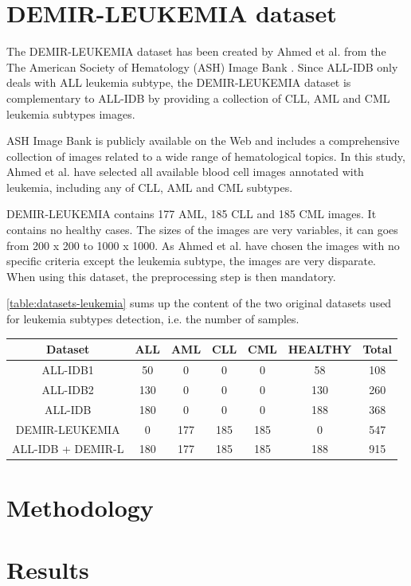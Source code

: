 \documentclass[11pt, openany]{report}
\theoremstyle{plain}
\theoremstyle{definition}
\theoremstyle{remark}
\begin{document}
\newpage
\section{DEMIR-LEUKEMIA dataset}
The DEMIR-LEUKEMIA dataset has been created by Ahmed et al. \cite{leukemia} from the The American Society of Hematology (ASH) Image Bank \cite{ASH}. Since ALL-IDB only deals with ALL leukemia subtype, the DEMIR-LEUKEMIA dataset is complementary to ALL-IDB by providing a collection of CLL, AML and CML leukemia subtypes images.  

ASH Image Bank is publicly available on the Web and includes a comprehensive collection of
images related to a wide range of hematological topics. In this study, Ahmed et al. have selected all available blood cell images annotated with leukemia, including any of CLL, AML and CML subtypes. 

DEMIR-LEUKEMIA contains 177 AML, 185 CLL and 185 CML images. It contains no healthy cases. The sizes of the images are very variables, it can goes from 200 x 200 to 1000 x 1000. As Ahmed et al. have chosen the images with no specific criteria except the leukemia subtype, the images are very disparate. When using this dataset, the preprocessing step is then mandatory. 

\autoref{table:datasets-leukemia} sums up the content of the two original datasets used for leukemia subtypes detection, i.e. the number of samples. 

\begin{center}
    \begin{tabular}{|c|c|c|c|c|c|c|}
      \hline
      \textbf{Dataset} & \textbf{ALL} & \textbf{AML} & \textbf{CLL} & \textbf{CML} & \textbf{HEALTHY} & \textbf{Total}\\
      \hline
      ALL-IDB1 & 50 & 0 & 0 & 0 & 58 & 108  \\
      \hline
      ALL-IDB2 & 130 & 0 & 0 & 0 & 130 & 260  \\
      \hline
      ALL-IDB & 180 & 0 & 0 & 0 & 188 & 368  \\
      \hline
      DEMIR-LEUKEMIA & 0 & 177 & 185 & 185 & 0 & 547  \\
      \hline
      \hline
      ALL-IDB + DEMIR-L & 180 & 177 & 185 & 185 & 188 & 915 \\ 
      \hline
    \end{tabular}
    \label{table:datasets-leukemia}
\end{center} 

\section{Methodology}

\section{Results}



\nocite{*}

\end{document}

